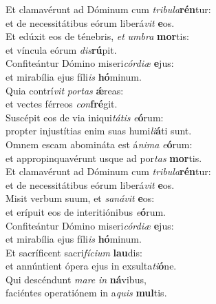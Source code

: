 \oddverse Et clamavérunt ad Dóminum cum \textit{tri}\textit{bu}\textit{la}\textbf{rén}tur:~\*\\
\oddverse et de necessitátibus eórum liberá\textit{vit} \textbf{e}os.\\
\evenverse Et edúxit eos de ténebris, \textit{et} \textit{um}\textit{bra} \textbf{mor}tis:~\*\\
\evenverse et víncula eórum \textit{dis}\textbf{rú}pit.\\
\oddverse Confiteántur Dómino miseri\textit{cór}\textit{di}\textit{æ} \textbf{e}jus:~\*\\
\oddverse et mirabília ejus fíli\textit{is} \textbf{hó}minum.\\
\evenverse Quia contrí\textit{vit} \textit{por}\textit{tas} \textbf{ǽ}reas:~\*\\
\evenverse et vectes férreos \textit{con}\textbf{fré}git.\\
\oddverse Suscépit eos de via iniqui\textit{tá}\textit{tis} \textit{e}\textbf{ó}rum:~\*\\
\oddverse propter injustítias enim suas humi\textit{li}\textbf{á}ti sunt.\\
\evenverse Omnem escam abomináta est á\textit{ni}\textit{ma} \textit{e}\textbf{ó}rum:~\*\\
\evenverse et appropinquavérunt usque ad por\textit{tas} \textbf{mor}tis.\\
\oddverse Et clamavérunt ad Dóminum cum \textit{tri}\textit{bu}\textit{la}\textbf{rén}tur:~\*\\
\oddverse et de necessitátibus eórum liberá\textit{vit} \textbf{e}os.\\
\evenverse Misit verbum suum, et \textit{sa}\textit{ná}\textit{vit} \textbf{e}os:~\*\\
\evenverse et erípuit eos de interitiónibus \textit{e}\textbf{ó}rum.\\
\oddverse Confiteántur Dómino miseri\textit{cór}\textit{di}\textit{æ} \textbf{e}jus:~\*\\
\oddverse et mirabília ejus fíli\textit{is} \textbf{hó}minum.\\
\evenverse Et sacríficent sacri\textit{fí}\textit{ci}\textit{um} \textbf{lau}dis:~\*\\
\evenverse et annúntient ópera ejus in exsulta\textit{ti}\textbf{ó}ne.\\
\oddverse Qui descéndunt \textit{ma}\textit{re} \textit{in} \textbf{ná}vibus,~\*\\
\oddverse faciéntes operatiónem in a\textit{quis} \textbf{mul}tis.\\
